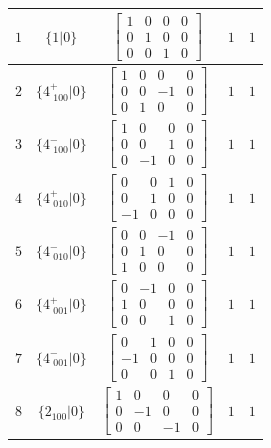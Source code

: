 \documentclass[fleqn,8pt]{jsarticle}
\begin{document}
\begin{longtable}{ccccc}
$ 1 $ & $ \{1|0\} $ & $ \begin{bmatrix} 1 & 0 & 0 & 0 \\ 0 & 1 & 0 & 0 \\ 0 & 0 & 1 & 0 \end{bmatrix} $ & $ 1 $ & $ 1 $ \\ \hline
$ 2 $ & $ \{4^{+}_{\,\,100}|0\} $ & $ \begin{bmatrix} 1 & 0 & 0 & 0 \\ 0 & 0 & -1 & 0 \\ 0 & 1 & 0 & 0 \end{bmatrix} $ & $ 1 $ & $ 1 $ \\ \hline
$ 3 $ & $ \{4^{-}_{\,\,100}|0\} $ & $ \begin{bmatrix} 1 & 0 & 0 & 0 \\ 0 & 0 & 1 & 0 \\ 0 & -1 & 0 & 0 \end{bmatrix} $ & $ 1 $ & $ 1 $ \\ \hline
$ 4 $ & $ \{4^{+}_{\,\,010}|0\} $ & $ \begin{bmatrix} 0 & 0 & 1 & 0 \\ 0 & 1 & 0 & 0 \\ -1 & 0 & 0 & 0 \end{bmatrix} $ & $ 1 $ & $ 1 $ \\ \hline
$ 5 $ & $ \{4^{-}_{\,\,010}|0\} $ & $ \begin{bmatrix} 0 & 0 & -1 & 0 \\ 0 & 1 & 0 & 0 \\ 1 & 0 & 0 & 0 \end{bmatrix} $ & $ 1 $ & $ 1 $ \\ \hline
$ 6 $ & $ \{4^{+}_{\,\,001}|0\} $ & $ \begin{bmatrix} 0 & -1 & 0 & 0 \\ 1 & 0 & 0 & 0 \\ 0 & 0 & 1 & 0 \end{bmatrix} $ & $ 1 $ & $ 1 $ \\ \hline
$ 7 $ & $ \{4^{-}_{\,\,001}|0\} $ & $ \begin{bmatrix} 0 & 1 & 0 & 0 \\ -1 & 0 & 0 & 0 \\ 0 & 0 & 1 & 0 \end{bmatrix} $ & $ 1 $ & $ 1 $ \\ \hline
$ 8 $ & $ \{2{}_{100}|0\} $ & $ \begin{bmatrix} 1 & 0 & 0 & 0 \\ 0 & -1 & 0 & 0 \\ 0 & 0 & -1 & 0 \end{bmatrix} $ & $ 1 $ & $ 1 $ \\ \hline

\end{longtable}
\end{document}
